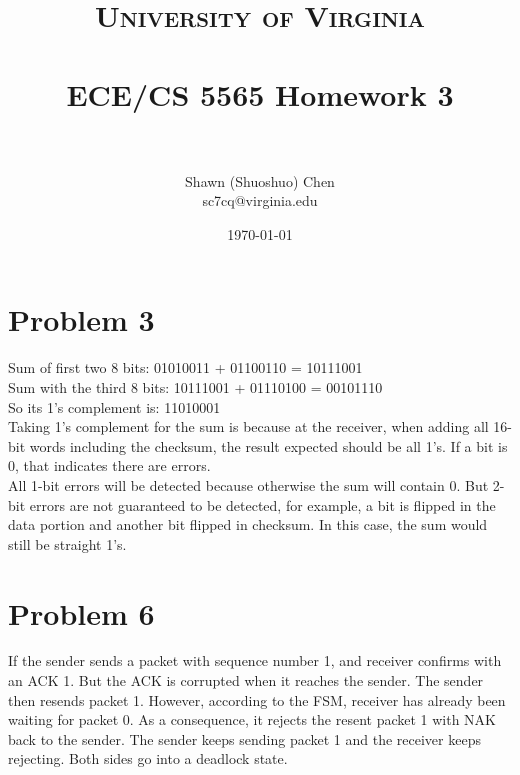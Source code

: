 \documentclass[titlepage, paper=a4, fontsize=11pt]{scrartcl} %
\title{	
\normalfont \normalsize 
\textsc{University of Virginia} \\ [25pt] %
\horrule{0.5pt} \\[0.4cm] %
\huge ECE/CS 5565 Homework 3 \\ %
\horrule{2pt} \\[0.5cm] %
}
\author{Shawn (Shuoshuo) Chen\\sc7cq@virginia.edu} %
\date{\normalsize\today} %
\numberwithin{equation}{section} %
\numberwithin{table}{section} %
\begin{document}
\maketitle %


\section*{Problem 3}

Sum of first two 8 bits: 01010011 + 01100110 = 10111001 \\
Sum  with the third 8 bits: 10111001 + 01110100 = 00101110 \\
So its 1's complement is: 11010001 \\
Taking 1's complement for the sum is because at the receiver, when adding all 16-bit words
including the checksum, the result expected should be all 1's. If a bit is 0, that indicates there
are errors. \\

All 1-bit errors will be detected because otherwise the sum will contain 0. But 2-bit errors are
not guaranteed to be detected, for example, a bit is flipped in the data portion and another bit
flipped in checksum. In this case, the sum would still be straight 1's.
\\



\section*{Problem 6}
If the sender sends a packet with sequence number 1, and receiver confirms with an ACK 1.
But the ACK is corrupted when it reaches the sender. The sender then resends packet 1. However,
according to the FSM, receiver has already been waiting for packet 0. As a consequence, it rejects
the resent packet 1 with NAK back to the sender. The sender keeps sending packet 1 and the receiver
keeps rejecting. Both sides go into a deadlock state.
\\


\end{document}
